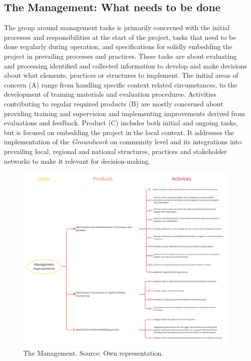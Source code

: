 \subsection{The Management: What needs to be done}\label{subsubsec:management}
The group around management tasks is primarily concerned with the initial processes and responsibilities at the start of the project, tasks that need to be done regularly during operation, and specifications for solidly embedding the project in prevailing processes and practices. These tasks are about evaluating and processing identified and collected information to develop and make decisions about what elements, practices or structures to implement. The initial areas of concern (A) range from handling specific context related circumstances, to the development of training materials and evaluation procedures. Activities contributing to regular required products (B) are mostly concerned about providing training and supervision and implementing improvements derived from evaluations and feedback. Product (C) includes both initial and ongoing tasks, but is focused on embedding the project in the local context. It addresses the implementation of the \textit{Groundwork} on community level and its integrations into prevailing local, regional and national structures, practices and stakeholder networks to make it relevant for decision-making.

\begin{figure}[!htp]
    \centering
    \includegraphics[width=1.0\textwidth]{figures/2023_MA_results_management.pdf}
    \decoRule
    \caption[The Management]{The Management. Source: Own representation.}
    \label{fig:res_management}
\end{figure}

